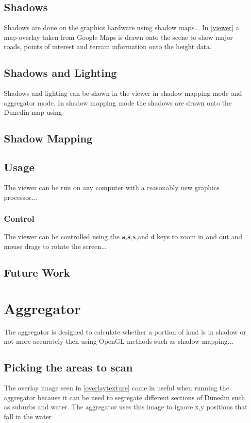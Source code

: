 \documentclass[12pt]{report}
\begin{document}
\section{Shadows}
Shadows are done on the graphics hardware using shadow maps...
In \ref{viewer} a map overlay taken from Google Maps\cite{gmaps} is drawn onto the scene to show major roads, points of interest and terrain information onto the height data. 
\section{Shadows and Lighting}
Shadows and lighting can be shown in the viewer in shadow mapping mode and aggregator mode. In shadow mapping mode the shadows are drawn onto the Dunedin map using 

\section{Shadow Mapping}

\section{Usage}
The viewer can be run on any computer with a reasonably new graphics processor...
\subsection{Control}
The viewer can be controlled using the \texttt{w},\texttt{a},\texttt{s},and \texttt{d} keys to zoom in and out and mouse drags to rotate the screen...
\section{Future Work}
\chapter{Aggregator}
The aggregator is designed to calculate whether a portion of land is in shadow or not more accurately then using OpenGL methods such as shadow mapping...


\section{Picking the areas to scan}
The overlay image seen in \ref{overlaytexture} came in useful when running the aggregator because it can be used to segregate different sections of Dunedin such as suburbs and water. The aggregator uses this image to ignore x,y positions that fall in the water 
\end{document}
